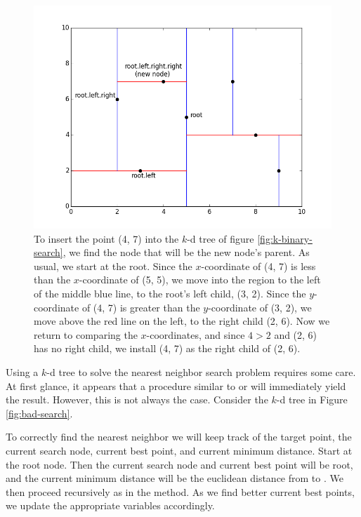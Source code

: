 \begin{figure}[H]
\includegraphics[width=\textwidth]{kdpic2.png}
\caption{To insert the point (4, 7) into the $k$-d tree of figure \ref{fig:k-binary-search}, we find the node that will be the new node's parent. As usual, we start at the root. Since the $x$-coordinate of (4, 7) is less than the $x$-coordinate of (5, 5), we move into the region to the left of the middle blue line, to the root's left child, (3, 2). Since the $y$-coordinate of (4, 7) is greater than the $y$-coordinate of (3, 2), we move above the red line on the left, to the right child (2, 6). Now we return to comparing the $x$-coordinates, and since $4 > 2$ and (2, 6) has no right child, we install (4, 7) as the right child of (2, 6).}
\label{fig:k-insert}
\end{figure}

Using a $k$-d tree to solve the nearest neighbor search problem requires some care.
At first glance, it appears that a procedure similar to  or  will immediately yield the result.
However, this is not always the case.
Consider the $k$-d tree in Figure \ref{fig:bad-search}.

To correctly find the nearest neighbor we will keep track of the target point, the current search node, current best point, and current minimum distance.
Start at the root node.
Then the current search node and current best point will be root, and the current minimum distance will be the euclidean distance from  to .
We then proceed recursively as in the  method.
As we find better current best points, we update the appropriate variables accordingly.

